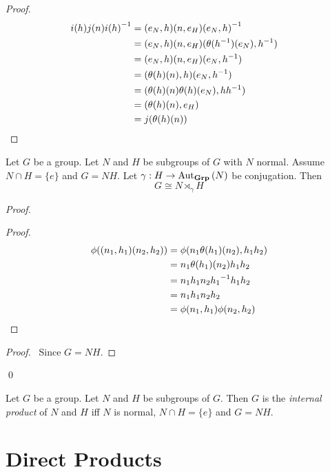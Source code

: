 \begin{proof}
\pf
\begin{align*}
	i(h) j(n) {i(h)}^{-1} & = (e_N,h)(n,e_H){(e_N,h)}^{-1} \\
	& = (e_N,h)(n,e_H)(\theta({h}^{-1})(e_N),{h}^{-1})\\
	& = (e_N,h)(n,e_H)(e_N,{h}^{-1}) \\
	& = (\theta(h)(n),h)(e_N,{h}^{-1}) \\
	& = (\theta(h)(n)\theta(h)(e_N),h {h}^{-1}) \\
	& = (\theta(h)(n), e_H) \\
	& = j(\theta(h)(n)) & \relax
\end{align*}
\end{proof}

\begin{prop}
\label{prop:internal-product}
Let $G$ be a group. Let $N$ and $H$ be subgroups of $G$ with $N$ normal. Assume $N \cap H = \{e\}$ and $G = NH$. Let $\gamma : H \rightarrow \mathrm{Aut}_{\mathbf{Grp}} \left( {N} \right)$ be conjugation. Then
\[ G \cong N \rtimes_\gamma H \]
\end{prop}

\begin{proof}
\pf
{}
\begin{proof}
	\pf
	\begin{align*}
		\phi((n_1,h_1)(n_2,h_2)) & = \phi(n_1 \theta(h_1)(n_2), h_1 h_2) \\
		& = n_1 \theta(h_1)(n_2) h_1 h_2 \\
		& = n_1 h_1 n_2 {h_1}^{-1} h_1 h_2 \\
		& = n_1 h_1 n_2 h_2 \\
		& = \phi(n_1,h_1) \phi(n_2,h_2)
	\end{align*}
\end{proof}
\begin{proof}
	\pf\ Since $G = NH$.
\end{proof}
\qed
\end{proof}

\begin{df}
Let $G$ be a group. Let $N$ and $H$ be subgroups of $G$. Then $G$ is the \emph{internal product} of $N$ and $H$ iff $N$ is normal, $N \cap H = \{e\}$ and $G = NH$.
\end{df}

\section{Direct Products}

